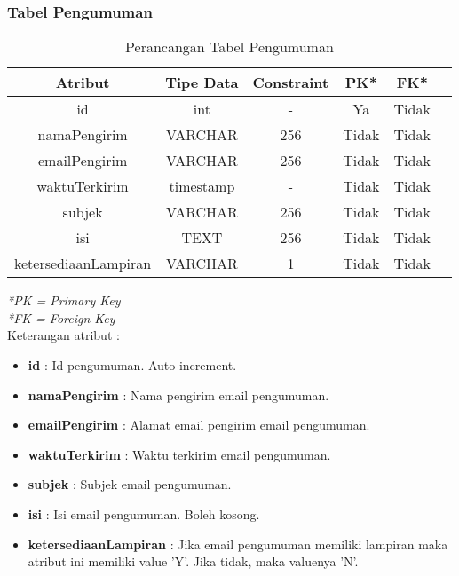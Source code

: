 \subsubsection{Tabel Pengumuman}
\begin{center}
	\begin{table}[H]
	\caption{Perancangan Tabel Pengumuman}
	\begin{tabular}{|c|c|c|c|c|c|}
 			\hline
			\textbf{Atribut} & \textbf{Tipe Data} & \textbf{Constraint} & \textbf{PK*}  & \textbf{FK*} \\
			\hline
		 	 id & int & - & Ya & Tidak\\
			\hline
			 namaPengirim & VARCHAR & 256 & Tidak & Tidak\\
            \hline
			 emailPengirim & VARCHAR & 256 & Tidak & Tidak\\
            \hline
			 waktuTerkirim & timestamp & - & Tidak & Tidak\\
            \hline
			 subjek & VARCHAR & 256 & Tidak & Tidak\\
            \hline
			 isi & TEXT & 256 & Tidak & Tidak\\
            \hline
			 ketersediaanLampiran & VARCHAR & 1 & Tidak & Tidak\\
			\hline
	\end{tabular}
	\end{table}
\end{center}
\textit{*PK = Primary Key} \\
\textit{*FK = Foreign Key} \\

Keterangan atribut :
\begin{itemize}
\item \textbf{id} : Id pengumuman. Auto increment.
\item \textbf{namaPengirim} : Nama pengirim email pengumuman.
\item \textbf{emailPengirim} : Alamat email pengirim email pengumuman.
\item \textbf{waktuTerkirim} : Waktu terkirim email pengumuman.
\item \textbf{subjek} : Subjek email pengumuman.
\item \textbf{isi} : Isi email pengumuman. Boleh kosong.
\item \textbf{ketersediaanLampiran} : Jika email pengumuman memiliki lampiran maka atribut ini memiliki value 'Y'. Jika tidak, maka valuenya 'N'.
\end{itemize}


